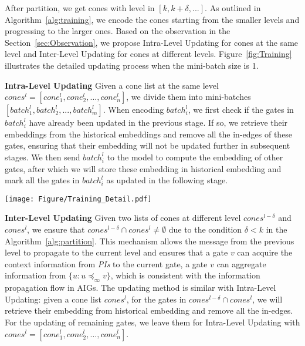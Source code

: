 After partition, we get cones with level in $[k, k+\delta, ...]$. As outlined in Algorithm~\ref{alg:training}, we encode the cones starting from the smaller levels and progressing to the larger ones. Based on the observation in the Section~\ref{sec:Observation}, we propose Intra-Level Updating for cones at the same level and Inter-Level Updating for cones at different levels. Figure~\ref{fig:Training} illustrates the detailed updating process when the mini-batch size is 1.


\begin{minipage}{0.6\textwidth}
\noindent\textbf{Intra-Level Updating} Given a cone list at the same level $cones^l=[cone^l_1, cone^l_2, ..., cone^l_n]$, we divide them into mini-batches $[batch^l_1, batch^l_2, ..., batch^l_m]$.
When encoding $batch^l_i$, we first check if the gates in $batch^l_i$ have already been updated in the previous stage. If so, we retrieve their embeddings from the historical embeddings and remove all the in-edges of these gates, ensuring that their embedding will not be updated further in subsequent stages. We then send $batch^l_i$ to the model to compute the embedding of other gates, after which we will store these embedding in historical embedding and mark all the gates in $batch^l_i$ as updated in the following stage.
\end{minipage}
\hspace{3pt}
\begin{minipage}{0.4\textwidth}
    \centering
    \texttt{[image: Figure/Training\_Detail.pdf]}
    \vspace{-5pt}
    \label{fig:Training}
\end{minipage}


\noindent\textbf{Inter-Level Updating} Given two lists of cones at different level $cones^{l-\delta}$ and $cones^l$, we ensure that $cones^{l-\delta} \cap cones^l \neq \emptyset$ due to the condition $\delta<k$ in the Algorithm~\ref{alg:partition}. This mechanism allows the message from the previous level to propagate to the current level and ensures that a gate $v$ can acquire the context information from \textit{PIs} to the current gate, \ie a gate $v$ can aggregate information from $\{u:u\preccurlyeq_\infty v\}$, which is consistent with the information propagation flow in AIGs. The updating method is similar with Intra-Level Updating: given a cone list $cones^l$, for the gates in $cones^{l-\delta} \cap cones^l$, we will retrieve their embedding from historical embedding and remove all the in-edges. For the updating of remaining gates, we leave them for Intra-Level Updating with $cones^l=[cone^l_1, cone^l_2, ..., cone^l_n]$.
 
